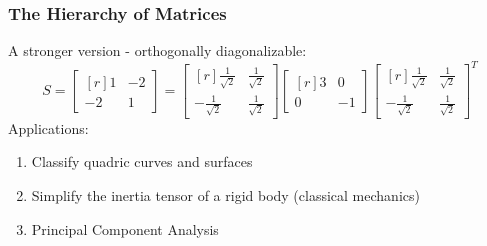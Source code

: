 \documentclass[10pt]{beamer}
\begin{document}
\begin{frame}
\frametitle{The Hierarchy of Matrices}
A stronger version - orthogonally diagonalizable:
\[
S = \begin{bmatrix*}[r]
1&-2\\[1em]
-2&1
\end{bmatrix*} = \begin{bmatrix*}[r]
\frac{1}{\sqrt 2}&\frac{1}{\sqrt 2}\\[1em]
-\frac{1}{\sqrt 2}&\frac{1}{\sqrt 2}
\end{bmatrix*}\begin{bmatrix*}[r]
3&0\\[1em]
0&-1
\end{bmatrix*}\begin{bmatrix*}[r]
\frac{1}{\sqrt 2}&\frac{1}{\sqrt 2}\\[1em]
-\frac{1}{\sqrt 2}&\frac{1}{\sqrt 2}
\end{bmatrix*}^T
\]
\pause
Applications:
\begin{enumerate}[label = {(\alph*)}]
\item Classify quadric curves and surfaces
\item Simplify the inertia tensor of a rigid body (classical mechanics)
\item Principal Component Analysis
\end{enumerate}
\end{frame}
\end{document}

